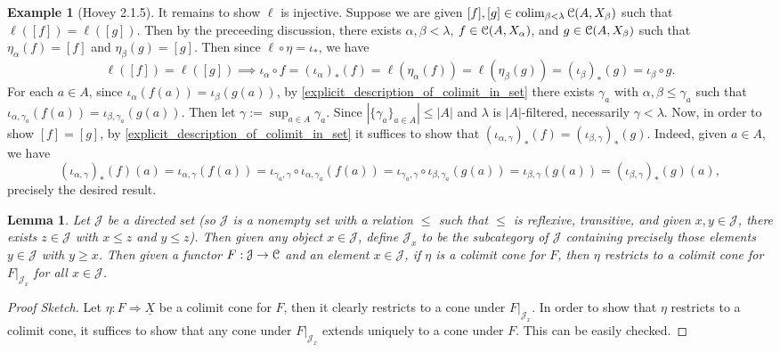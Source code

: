 \documentclass{amsart}
\theoremstyle{plain}
\newtheorem{lemma}[theorem]{Lemma}
\theoremstyle{definition}
\newtheorem{example}[theorem]{Example}
\newcommand{\0}{\mathbf{0}}
\newcommand{\cC}{\mathcal C}
\newcommand{\cJ}{\mathcal J}
\newcommand{\ul}{\underline}
\renewcommand{\(}{\left(}
\renewcommand{\)}{\right)}
\def\scr{\EuScript}
\def\cC{\scr{C}}
\DeclareMathOperator*{\colim}{colim}
\begin{document}
\begin{example}[Hovey 2.1.5]
  It remains to show $\ell$ is injective. Suppose we are given $[f],[g]\in\colim_{\beta<\lambda}\cC(A,X_\beta)$ such that $\ell([f])=\ell([g])$. Then by the preceeding discussion, there exists $\alpha,\beta<\lambda$, $f\in\cC(A,X_\alpha)$, and $g\in\cC(A,X_\beta)$ such that $\eta_\alpha(f)=[f]$ and $\eta_\beta(g)=[g]$. 
  Then since $\ell\circ\eta=\iota_*$, we have
  \[\ell([f])=\ell([g])\implies\iota_\alpha\circ f= (\iota_\alpha)_*(f)=\ell(\eta_\alpha(f))=\ell(\eta_\beta(g))=(\iota_\beta)_*(g)=\iota_\beta\circ g.\]
  For each $a\in A$, since $\iota_\alpha(f(a))=\iota_\beta(g(a))$, by \autoref{explicit_description_of_colimit_in_set} there exists $\gamma_a$ with $\alpha,\beta\leq\gamma_a$ such that $\iota_{\alpha,\gamma_a}(f(a))=\iota_{\beta,\gamma_a}(g(a))$. Then let $\gamma:=\sup_{a\in A}\gamma_a$. Since $|\{\gamma_a\}_{a\in A}|\leq|A|$ and $\lambda$ is $|A|$-filtered, necessarily $\gamma<\lambda$. Now, in order to show $[f]=[g]$, by \autoref{explicit_description_of_colimit_in_set} it suffices to show that $(\iota_{\alpha,\gamma})_*(f)=(\iota_{\beta,\gamma})_*(g)$. Indeed, given $a\in A$, we have
  \[(\iota_{\alpha,\gamma})_*(f)(a)=\iota_{\alpha,\gamma}(f(a))=\iota_{\gamma_a,\gamma}\circ\iota_{\alpha,\gamma_a}(f(a))=\iota_{\gamma_a,\gamma}\circ\iota_{\beta,\gamma_a}(g(a))=\iota_{\beta,\gamma}(g(a))=(\iota_{\beta,\gamma})_*(g)(a),\]
  precisely the desired result.
\end{example}

\begin{lemma}\label{colimit_of_directed_set_can_be_truncated}
  Let $\cJ$ be a directed set (so $\cJ$ is a nonempty set with a relation $\leq$ such that $\leq$ is reflexive, transitive, and given $x,y\in\cJ$, there exists $z\in\cJ$ with $x\leq z$ and $y\leq z$). Then given any object $x\in\cJ$, define $\cJ_x$ to be the subcategory of $\cJ$ containing precisely those elements $y\in\cJ$ with $y\geq x$. Then given a functor $F:\cJ\to\cC$ and an element $x\in\cJ$, if $\eta$ is a colimit cone for $F$, then $\eta$ restricts to a colimit cone for $F|_{\cJ_x}$ for all $x\in\cJ$.
\end{lemma}
\begin{proof}[Proof Sketch]
  Let $\eta:F\Rightarrow\ul X$ be a colimit cone for $F$, then it clearly restricts to a cone under $F|_{\cJ_x}$. In order to show that $\eta$ restricts to a colimit cone, it suffices to show that any cone under $F|_{\cJ_x}$ extends uniquely to a cone under $F$. This can be easily checked.
\end{proof}
\end{document}
